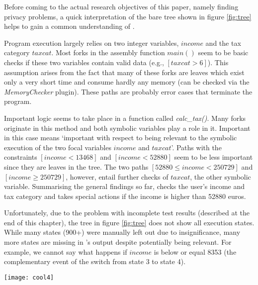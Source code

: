 \medskip

Before coming to the actual research objectives of this paper, namely finding privacy problems, a quick interpretation of the bare tree shown in figure \ref{fig:tree} helps to gain a common understanding of \app.

Program execution largely relies on two integer variables, $income$ and the tax category $taxcat$.
Most forks in the assembly function $main()$ seem to be basic checks if these two variables contain valid data (e.g., $[taxcat > 6]$).
This assumption arises from the fact that many of these forks are leaves which exist only a very short time and consume hardly any memory (can be checked via the \textit{MemoryChecker} plugin).
These paths are probably error cases that terminate the program.

Important logic seems to take place in a function called \textit{calc\_tax()}.
Many forks originate in this method and both symbolic variables play a role in it.
Important in this case means `important with respect to being relevant to the symbolic execution of the two focal variables $income$ and $taxcat$'.
Paths with the constraints $[income < 13468]$ and $[income < 52880]$ seem to be less important since they are leaves in the tree.
The two paths $[52880 \le income < 250729]$ and $[income \ge 250729]$, however, entail further checks of $taxcat$, the other symbolic variable.
Summarising the general findings so far, \app checks the user's income and tax category and takes special actions if the income is higher than 52880 euros.

Unfortunately, due to the problem with incomplete test results (described at the end of this chapter), the tree in figure \ref{fig:tree} does not show all execution states.
While many states (900+) were manually left out due to insignificance, many more states are missing in \sse's output despite potentially being relevant.
For example, we cannot say what happens if $income$ is below or equal 8353 (the complementary event of the switch from state 3 to state 4).

\begin{figure*}
\texttt{[image: cool4]}
\caption{Tree visualisation for understanding path forking behaviour in the analysis of \app. Shows at which memory addresses \sse forked new execution states. Path constraints are printed at each state transition. For most states, the \textit{TestCaseGenerator} found meaningful concrete example values for the two symbolic variables $income$ and $taxcat$. Blue dots symbolise that in this state a ``donation'' message was transferred to a server. Red dots mark states which leak the complete set of user inputs.}
\label{fig:tree}
\end{figure*}

